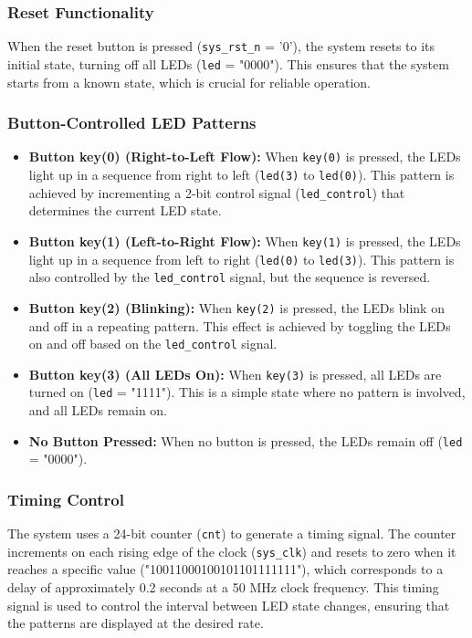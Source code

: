 \documentclass[]{article}
\begin{document}
\subsubsection{Reset Functionality}
When the reset button is pressed (\texttt{sys\_rst\_n} = '0'), the system resets to its initial state, turning off all LEDs (\texttt{led} = "0000"). This ensures that the system starts from a known state, which is crucial for reliable operation.

\subsubsection{Button-Controlled LED Patterns}
\begin{itemize}
    \item \textbf{Button key(0) (Right-to-Left Flow):} When \texttt{key(0)} is pressed, the LEDs light up in a sequence from right to left (\texttt{led(3)} to \texttt{led(0)}). This pattern is achieved by incrementing a 2-bit control signal (\texttt{led\_control}) that determines the current LED state.
    \item \textbf{Button key(1) (Left-to-Right Flow):} When \texttt{key(1)} is pressed, the LEDs light up in a sequence from left to right (\texttt{led(0)} to \texttt{led(3)}). This pattern is also controlled by the \texttt{led\_control} signal, but the sequence is reversed.
    \item \textbf{Button key(2) (Blinking):} When \texttt{key(2)} is pressed, the LEDs blink on and off in a repeating pattern. This effect is achieved by toggling the LEDs on and off based on the \texttt{led\_control} signal.
    \item \textbf{Button key(3) (All LEDs On):} When \texttt{key(3)} is pressed, all LEDs are turned on (\texttt{led} = "1111"). This is a simple state where no pattern is involved, and all LEDs remain on.
    \item \textbf{No Button Pressed:} When no button is pressed, the LEDs remain off (\texttt{led} = "0000").
\end{itemize}

\subsubsection{Timing Control}
The system uses a 24-bit counter (\texttt{cnt}) to generate a timing signal. The counter increments on each rising edge of the clock (\texttt{sys\_clk}) and resets to zero when it reaches a specific value ("10011000100101101111111"), which corresponds to a delay of approximately 0.2 seconds at a 50 MHz clock frequency. This timing signal is used to control the interval between LED state changes, ensuring that the patterns are displayed at the desired rate.
\end{document}
